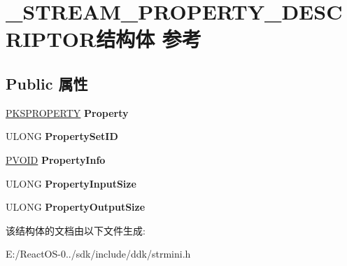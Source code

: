 \hypertarget{struct___s_t_r_e_a_m___p_r_o_p_e_r_t_y___d_e_s_c_r_i_p_t_o_r}{}\section{\+\_\+\+S\+T\+R\+E\+A\+M\+\_\+\+P\+R\+O\+P\+E\+R\+T\+Y\+\_\+\+D\+E\+S\+C\+R\+I\+P\+T\+O\+R结构体 参考}
\label{struct___s_t_r_e_a_m___p_r_o_p_e_r_t_y___d_e_s_c_r_i_p_t_o_r}
\subsection*{Public 属性}
\begin{DoxyCompactItemize}
\item 
\mbox{\label{struct___s_t_r_e_a_m___p_r_o_p_e_r_t_y___d_e_s_c_r_i_p_t_o_r_a71f66c1ab7e2b64d1d5d04319c11c28d}} 
\hyperlink{struct_k_s_i_d_e_n_t_i_f_i_e_r}{P\+K\+S\+P\+R\+O\+P\+E\+R\+TY} {\bfseries Property}
\item 
\mbox{\label{struct___s_t_r_e_a_m___p_r_o_p_e_r_t_y___d_e_s_c_r_i_p_t_o_r_a9a89793ab0400b287e242a4034de00aa}} 
U\+L\+O\+NG {\bfseries Property\+Set\+ID}
\item 
\mbox{\label{struct___s_t_r_e_a_m___p_r_o_p_e_r_t_y___d_e_s_c_r_i_p_t_o_r_a4ce8286a6bcac803c8ca66b2b0d0597b}} 
\hyperlink{interfacevoid}{P\+V\+O\+ID} {\bfseries Property\+Info}
\item 
\mbox{\label{struct___s_t_r_e_a_m___p_r_o_p_e_r_t_y___d_e_s_c_r_i_p_t_o_r_a3b17eff8ec330721eff8c285c13d5084}} 
U\+L\+O\+NG {\bfseries Property\+Input\+Size}
\item 
\mbox{\label{struct___s_t_r_e_a_m___p_r_o_p_e_r_t_y___d_e_s_c_r_i_p_t_o_r_ad4dfc68c2cb2c1aa0d41d18774d56a76}} 
U\+L\+O\+NG {\bfseries Property\+Output\+Size}
\end{DoxyCompactItemize}


该结构体的文档由以下文件生成\+:\begin{DoxyCompactItemize}
\item 
E\+:/\+React\+O\+S-\/0../sdk/include/ddk/strmini.\+h\end{DoxyCompactItemize}
